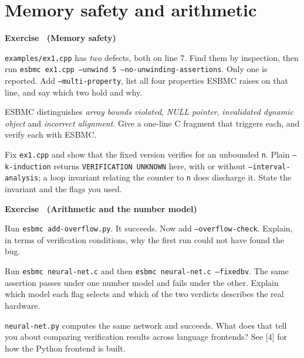 \documentclass[11pt,a4paper]{article}
\newcommand{\esbmc}{ESBMC}
\newcommand{\flag}[1]{\texttt{\small #1}}
\newcommand{\file}[1]{\texttt{\small #1}}
\newcounter{exc}
\renewcommand{\theexc}{\arabic{exc}}
\newenvironment{exercise}[2][]
  {\stepcounter{exc}\ifx\relax#1\relax\else\excref{#1}\fi%
   \medskip\noindent\textbf{Exercise \theexc\ (#2)}\par\nopagebreak\smallskip}
  {\par\medskip}
\begin{document}
\section{Memory safety and arithmetic}

\begin{exercise}{Memory safety}
\begin{parts}
  \item \file{examples/ex1.cpp} has \emph{two} defects, both on line 7. Find
        them by inspection, then run
        \texttt{esbmc ex1.cpp --unwind 5 --no-unwinding-assertions}. Only one is
        reported. Add \flag{--multi-property}, list all four properties \esbmc{}
        raises on that line, and say which two hold and why.
  \item \esbmc{} distinguishes \emph{array bounds violated},
        \emph{NULL pointer}, \emph{invalidated dynamic object} and
        \emph{incorrect alignment}. Give a one-line C fragment that triggers
        each, and verify each with \esbmc{}.
  \item Fix \file{ex1.cpp} and show that the fixed version verifies for an
        unbounded \texttt{n}. Plain \flag{--k-induction} returns
        \texttt{VERIFICATION UNKNOWN} here, with or without
        \flag{--interval-analysis}; a loop invariant relating the counter to
        \texttt{n} does discharge it. State the invariant and the flags you
        used.
\end{parts}
\end{exercise}

\begin{exercise}{Arithmetic and the number model}
\begin{parts}
  \item Run \texttt{esbmc add-overflow.py}. It succeeds. Now add
        \flag{--overflow-check}. Explain, in terms of verification conditions,
        why the first run could not have found the bug.
  \item Run \texttt{esbmc neural-net.c} and then
        \texttt{esbmc neural-net.c --fixedbv}. The same assertion passes under
        one number model and fails under the other. Explain which model each
        flag selects and which of the two verdicts describes the real hardware.
  \item \file{neural-net.py} computes the same network and succeeds. What does
        that tell you about comparing verification results across language
        frontends? See [4] for how the Python frontend is built.
\end{parts}
\end{exercise}
\end{document}
